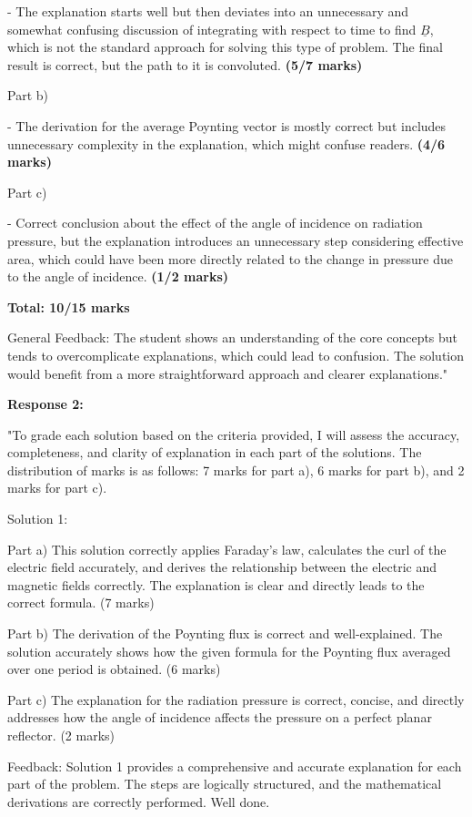 \documentclass[a4paper,11pt]{article}
\begin{document}
- The explanation starts well but then deviates into an unnecessary and somewhat confusing discussion of integrating with respect to time to find \(\underline{B}\), which is not the standard approach for solving this type of problem. The final result is correct, but the path to it is convoluted. \textbf{(5/7 marks)}

Part b)

- The derivation for the average Poynting vector is mostly correct but includes unnecessary complexity in the explanation, which might confuse readers. \textbf{(4/6 marks)}

Part c)

- Correct conclusion about the effect of the angle of incidence on radiation pressure, but the explanation introduces an unnecessary step considering effective area, which could have been more directly related to the change in pressure due to the angle of incidence. \textbf{(1/2 marks)}

\textbf{Total: 10/15 marks}

General Feedback: The student shows an understanding of the core concepts but tends to overcomplicate explanations, which could lead to confusion. The solution would benefit from a more straightforward approach and clearer explanations."

\textbf{Response 2:}

"To grade each solution based on the criteria provided, I will assess the accuracy, completeness, and clarity of explanation in each part of the solutions. The distribution of marks is as follows: 7 marks for part a), 6 marks for part b), and 2 marks for part c).

Solution 1:

Part a) This solution correctly applies Faraday's law, calculates the curl of the electric field accurately, and derives the relationship between the electric and magnetic fields correctly. The explanation is clear and directly leads to the correct formula. (7 marks)

Part b) The derivation of the Poynting flux is correct and well-explained. The solution accurately shows how the given formula for the Poynting flux averaged over one period is obtained. (6 marks)

Part c) The explanation for the radiation pressure is correct, concise, and directly addresses how the angle of incidence affects the pressure on a perfect planar reflector. (2 marks)

Feedback: Solution 1 provides a comprehensive and accurate explanation for each part of the problem. The steps are logically structured, and the mathematical derivations are correctly performed. Well done.
\end{document}
